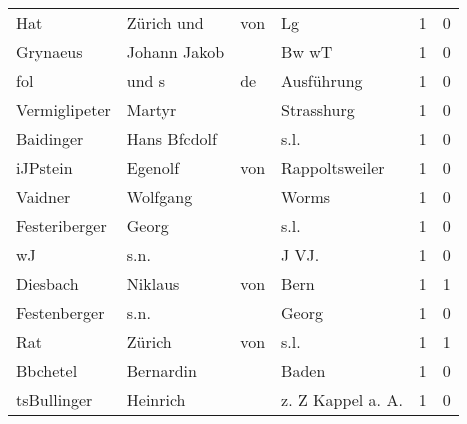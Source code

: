 \begin{center}
\begin{tiny}
\begin{longtabu}{llllrr}
                      Hat &                         Zürich und &         von &                                          Lg &          1 &         0 \\
                 Grynaeus &                       Johann Jakob &             &                                       Bw wT &          1 &         0 \\
                      fol &                              und s &          de &                                  Ausführung &          1 &         0 \\
            Vermiglipeter &                             Martyr &             &                                  Strasshurg &          1 &         0 \\
                Baidinger &                       Hans Bfcdolf &             &                                        s.l. &          1 &         0 \\
                 iJPstein &                            Egenolf &         von &                              Rappoltsweiler &          1 &         0 \\
                  Vaidner &                           Wolfgang &             &                                       Worms &          1 &         0 \\
            Festeriberger &                              Georg &             &                                        s.l. &          1 &         0 \\
                       wJ &                               s.n. &             &                                      J VJ.  &          1 &         0 \\
                 Diesbach &                            Niklaus &         von &                                        Bern &          1 &         1 \\
             Festenberger &                               s.n. &             &                                       Georg &          1 &         0 \\
                      Rat &                             Zürich &         von &                                        s.l. &          1 &         1 \\
                 Bbchetel &                          Bernardin &             &                                       Baden &          1 &         0 \\
              tsBullinger &                           Heinrich &             &                          z. Z Kappel a. A.  &          1 &         0 \\

\end{longtabu}
\end{tiny}
\end{center}
